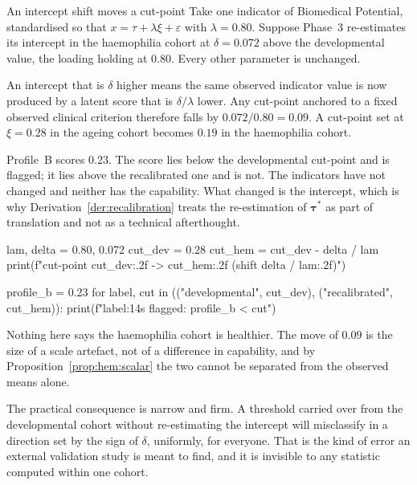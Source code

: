 \begin{workedexample}{An intercept shift moves a cut-point}
Take one indicator of Biomedical Potential, standardised so that
$x=\tau+\lambda\xi+\varepsilon$ with $\lambda=0.80$. Suppose Phase~3
re-estimates its intercept in the haemophilia cohort at $\delta=0.072$ above
the developmental value, the loading holding at $0.80$. Every other parameter
is unchanged.

An intercept that is $\delta$ higher means the same observed indicator value is
now produced by a latent score that is $\delta/\lambda$ lower. Any cut-point
anchored to a fixed observed clinical criterion therefore falls by
$0.072/0.80=0.09$. A cut-point set at $\xi=0.28$ in the ageing cohort becomes
$0.19$ in the haemophilia cohort.

Profile~B scores $0.23$. The score lies below the developmental cut-point and
is flagged; it lies above the recalibrated one and is not. The indicators have
not changed and neither has the capability. What changed is the intercept,
which is why Derivation~\ref{der:recalibration} treats the re-estimation of
$\boldsymbol\tau^*$ as part of translation and not as a technical afterthought.

\begin{wecode}[Python]
lam, delta = 0.80, 0.072
cut_dev = 0.28
cut_hem = cut_dev - delta / lam
print(f"cut-point {cut_dev:.2f} -> {cut_hem:.2f}  (shift {delta / lam:.2f})")

profile_b = 0.23
for label, cut in (("developmental", cut_dev), ("recalibrated", cut_hem)):
    print(f"{label:14s} flagged: {profile_b < cut}")
\end{wecode}

\end{workedexample}

\begin{reading}
Nothing here says the haemophilia cohort is healthier. The move of $0.09$ is
the size of a scale artefact, not of a difference in capability, and by
Proposition~\ref{prop:hem:scalar} the two cannot be separated from the observed
means alone.

The practical consequence is narrow and firm. A threshold carried over from the
developmental cohort without re-estimating the intercept will misclassify in a
direction set by the sign of $\delta$, uniformly, for everyone. That is the
kind of error an external validation study is meant to find, and it is invisible
to any statistic computed within one cohort.
\end{reading}

